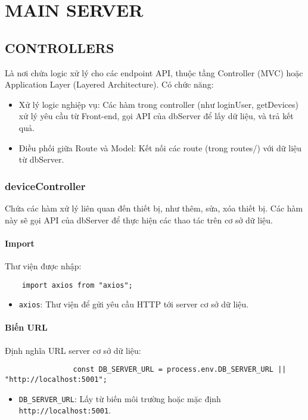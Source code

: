\chapter{MAIN SERVER}
    \section{CONTROLLERS}
        \hspace*{0.6cm}Là nơi chứa logic xử lý cho các endpoint API, thuộc tầng Controller (MVC) hoặc Application Layer (Layered Architecture). Có chức năng:
        \begin{itemize}
            \item Xử lý logic nghiệp vụ: Các hàm trong controller (như loginUser, getDevices) xử lý yêu cầu từ Front-end, gọi API của dbServer để lấy dữ liệu, và trả kết quả.
            \item Điều phối giữa Route và Model: Kết nối các route (trong routes/) với dữ liệu từ dbServer.
        \end{itemize}
        \subsection{deviceController}
            \hspace*{0.6cm}Chứa các hàm xử lý liên quan đến thiết bị, như thêm, sửa, xóa thiết bị. Các hàm này sẽ gọi API của dbServer để thực hiện các thao tác trên cơ sở dữ liệu.
            \subsubsection{Import}
                \hspace*{0.6cm}Thư viện được nhập:
                \begin{lstlisting}
    import axios from "axios";
                \end{lstlisting}
                \begin{itemize}
                    \item \texttt{axios}: Thư viện để gửi yêu cầu HTTP tới server cơ sở dữ liệu.
                \end{itemize}

            \subsubsection{Biến URL}
                \hspace*{0.6cm}Định nghĩa URL server cơ sở dữ liệu:
                \begin{lstlisting}
                const DB_SERVER_URL = process.env.DB_SERVER_URL || "http://localhost:5001";
                \end{lstlisting}
                \begin{itemize}
                    \item \texttt{DB\_SERVER\_URL}: Lấy từ biến môi trường hoặc mặc định \texttt{http://localhost:5001}.
                \end{itemize}


